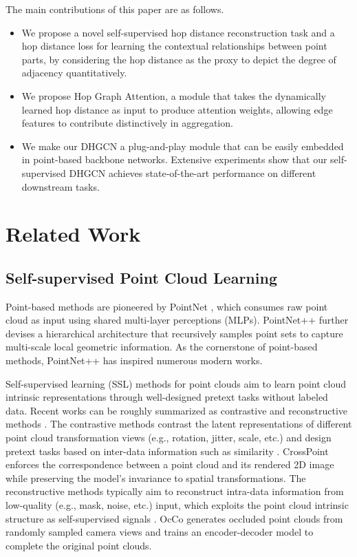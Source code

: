 \documentclass[letterpaper]{article} %
\begin{document}
The main contributions of this paper are as follows.
\begin{itemize}
\item We propose a novel self-supervised hop distance reconstruction task and a hop distance loss for learning the contextual relationships between point parts, by considering the hop distance as the proxy to depict the degree of adjacency quantitatively.
\item We propose Hop Graph Attention, a module that takes the dynamically learned hop distance as input to produce attention weights, allowing edge features to contribute distinctively in aggregation.
\item We make our DHGCN a plug-and-play module that can be easily embedded in point-based backbone networks.
Extensive experiments show that our self-supervised DHGCN achieves state-of-the-art performance on different downstream tasks.
\end{itemize}

\section{Related Work}

\subsection{Self-supervised Point Cloud Learning}
Point-based methods are pioneered by PointNet \cite{qi2017pointnet}, which consumes raw point cloud as input using shared multi-layer perceptions (MLPs).
PointNet++ \cite{pointnet++} further devises a hierarchical architecture that recursively samples point sets to capture multi-scale local geometric information.
As the cornerstone of point-based methods, PointNet++ has inspired numerous modern works.

Self-supervised learning (SSL) methods for point clouds aim to learn point cloud intrinsic representations through well-designed pretext tasks without labeled data.
Recent works can be roughly summarized as contrastive and reconstructive methods \cite{wu2021self}.
The contrastive methods contrast the latent representations of different point cloud transformation views (e.g., rotation, jitter, scale, etc.) and design pretext tasks based on inter-data information such as similarity \cite{xie2020pointcontrast, chen20214dcontrast,gao2020graphter}.
CrossPoint \cite{afham2022crosspoint} enforces the correspondence between a point cloud and its rendered 2D image while preserving the model's invariance to spatial transformations.
The reconstructive methods typically aim to reconstruct intra-data information from low-quality (e.g., mask, noise, etc.) input, which exploits the point cloud intrinsic structure as self-supervised signals \cite{yang2018foldingnet, yu2022point, pang2022masked}.
OcCo \cite{wang2021unsupervised} generates occluded point clouds from randomly sampled camera views and trains an encoder-decoder model to complete the original point clouds.
\end{document}
